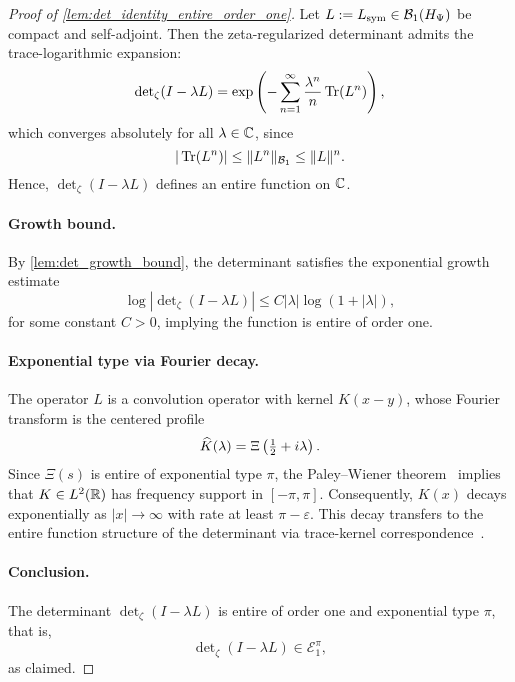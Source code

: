 \begin{proof}[Proof of \cref{lem:det_identity_entire_order_one}]
Let \( L := L_{\mathrm{sym}} \in \mathcal{B}_1(H_{\Psi}) \) be compact and self-adjoint. Then the zeta-regularized determinant admits the trace-logarithmic expansion:
\[
\det\nolimits_\zeta(I - \lambda L)
= \exp\left( - \sum_{n=1}^\infty \frac{\lambda^n}{n} \operatorname{Tr}(L^n) \right),
\]
which converges absolutely for all \( \lambda \in \mathbb{C} \), since
\[
|\operatorname{Tr}(L^n)| \le \|L^n\|_{\mathcal{B}_1} \le \|L\|^n.
\]
Hence, \( \det\nolimits_\zeta(I - \lambda L) \) defines an entire function on \( \mathbb{C} \).

\paragraph{Growth bound.}
By \cref{lem:det_growth_bound}, the determinant satisfies the exponential growth estimate
\[
\log \left| \det\nolimits_\zeta(I - \lambda L) \right|
\le C |\lambda| \log(1 + |\lambda|),
\]
for some constant \( C > 0 \), implying the function is entire of order one.

\paragraph{Exponential type via Fourier decay.}
The operator \( L \) is a convolution operator with kernel \( K(x - y) \), whose Fourier transform is the centered profile
\[
\widehat{K}(\lambda) = \Xi\left( \tfrac{1}{2} + i\lambda \right).
\]
Since \( \Xi(s) \) is entire of exponential type \( \pi \), the Paley--Wiener theorem~\cite[Ch.~9]{Levin1996EntireLectures} implies that \( K \in L^2(\mathbb{R}) \) has frequency support in \( [-\pi, \pi] \). Consequently, \( K(x) \) decays exponentially as \( |x| \to \infty \) with rate at least \( \pi - \varepsilon \). This decay transfers to the entire function structure of the determinant via trace-kernel correspondence~\cite[Ch.~3--4]{Simon2005TraceIdeals}.

\paragraph{Conclusion.}
The determinant \( \det\nolimits_\zeta(I - \lambda L) \) is entire of order one and exponential type \( \pi \), that is,
\[
\det\nolimits_\zeta(I - \lambda L) \in \mathcal{E}_1^\pi,
\]
as claimed.
\end{proof}
